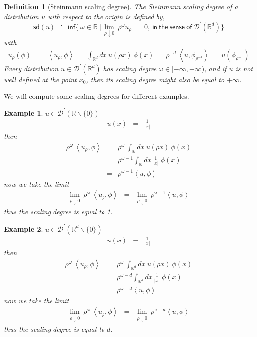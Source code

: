 \documentclass[10pt]{book}
\newcommand{\sd}{\mathsf{sd}}
\newcommand{\abs}[1]{\left|#1\right|}
\newcommand{\sm}[1]{\left\langle#1\right\rangle}
\renewcommand{\inf}{\mathsf{inf}}
\let\int\int
\newcommand{\Dcal}{\mathcal{D}}
\newcommand{\Rbb}{\mathbb{R}}
\theoremstyle{break}
\newtheorem{example}{Example}
\newtheorem{definition}{Definition}
\begin{document}
\begin{definition}[Steinmann scaling degree]
 The Steinmann scaling degree of a distribution $u$ with respect to the origin is defined by,
 \begin{equation*}
  \sd(u) \ \doteq \ \inf\bigg\{ \ \omega \in \Rbb \ \bigg| \ \lim_{\rho \downarrow 0} \ \rho^\omega u_\rho \ = \ 0, \ \mathsf{in \ the \ sense \ of \ } \Dcal^\prime(\Rbb^d) \bigg\}
 \end{equation*}
 with 
 \begin{eqnarray*}
  u_\rho(\phi) &=& \sm{u_\rho , \phi} \ = \ \int_{\Rbb^d} dx \ u(\rho x) \ \phi(x) \ = \ \rho^{-d} \ \sm{u , \phi_{\rho^{-1}}} \ = \ u(\phi_{\rho^{-1}})
 \end{eqnarray*}
 Every distribution $u \in \Dcal^\prime(\Rbb^d)$ has scaling degree $\omega \in [-\infty,+\infty)$, and if $u$ is not well defined at the point $x_0$, then its scaling degree might also be equal to $+\infty$. 
\end{definition}

We will compute some scaling degrees for different examples.

\begin{example} 
 $u \in \Dcal^\prime(\Rbb \backslash \{0\})$
 \begin{eqnarray*}
  u(x) &=& \frac{1}{\abs{x}}
 \end{eqnarray*}
 then
 \begin{eqnarray*}
  \rho^\omega \ \sm{u_\rho,\phi} &=& \rho^\omega \ \int_\Rbb dx \ u(\rho x) \ \phi(x) \\
  &=& \rho^{\omega-1} \int_\Rbb dx \ \frac{1}{\abs{x}} \ \phi(x) \\
  &=& \rho^{\omega-1} \sm{u , \phi}
 \end{eqnarray*}
 now we take the limit
 \begin{eqnarray*}
  \lim_{\rho \downarrow 0} \ \rho^\omega \ \sm{u_\rho,\phi} &=& \lim_{\rho \downarrow 0} \ \rho^{\omega-1} \sm{u , \phi} 
 \end{eqnarray*}
 thus the scaling degree is equal to 1. 
\end{example}

\begin{example} 
 $u \in \Dcal^\prime(\Rbb^d \backslash \{0\})$
 \begin{eqnarray*}
  u(x) &=& \frac{1}{\abs{x}}
 \end{eqnarray*}
 then
 \begin{eqnarray*}
  \rho^\omega \ \sm{u_\rho,\phi} &=& \rho^\omega \ \int_{\Rbb^d} dx \ u(\rho x) \ \phi(x) \\
  &=& \rho^{\omega-d} \int_{\Rbb^d} dx \ \frac{1}{\abs{x}} \ \phi(x) \\
  &=& \rho^{\omega-d} \sm{u , \phi}
 \end{eqnarray*}
 now we take the limit
 \begin{eqnarray*}
  \lim_{\rho \downarrow 0} \ \rho^\omega \ \sm{u_\rho,\phi} &=& \lim_{\rho \downarrow 0} \ \rho^{\omega-d} \sm{u , \phi} 
 \end{eqnarray*}
 thus the scaling degree is equal to $d$. 
\end{example}
\end{document}
